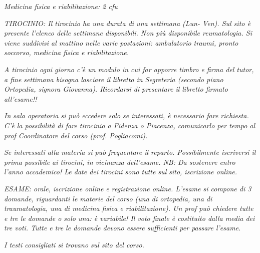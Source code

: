 \documentclass[]{article}
\begin{document}
\emph{Medicina fisica e riabilitazione: 2 cfu }

\emph{TIROCINIO: Il tirocinio ha una durata di una settimana (Lun- Ven).
Sul sito è presente l'elenco delle settimane disponibili. Non più
disponibile reumatologia. Si viene suddivisi al mattino nelle varie
postazioni: ambulatorio traumi, pronto soccorso, medicina fisica e
riabilitazione.}

\emph{A tirocinio ogni giorno c'è un modulo in cui far apporre timbro e
firma del tutor, a fine settimana bisogna lasciare il libretto in
Segreteria (secondo piano Ortopedia, signora Giovanna). Ricordarsi di
presentare il libretto firmato all'esame!!}

\emph{In sala operatoria si può eccedere solo se interessati, è
necessario fare richiesta. C'è la possibilità di fare tirocinio a
Fidenza o Piacenza, comunicarlo per tempo al prof Coordinatore del corso
(prof. Pogliacomi).}

\emph{Se interessati alla materia si può frequentare il reparto.
Possibilmente iscriversi il prima possibile ai tirocini, in vicinanza
dell'esame. \emph{NB: Da sostenere entro l'anno accademico!} Le date dei
tirocini sono tutte sul sito, iscrizione online.}

\emph{ESAME: orale, iscrizione online e registrazione online. L'esame si
compone di 3 domande, riguardanti le materie del corso (una di
ortopedia, una di traumatologia, una di medicina fisica e
riabilitazione). Un prof può chiedere tutte e tre le domande o solo una:
è variabile! Il voto finale è costituito dalla media dei tre voti.
\emph{Tutte e tre le domande devono essere sufficienti per passare
l'esame}.}

\emph{I testi consigliati si trovano sul sito del corso.}
\end{document}
